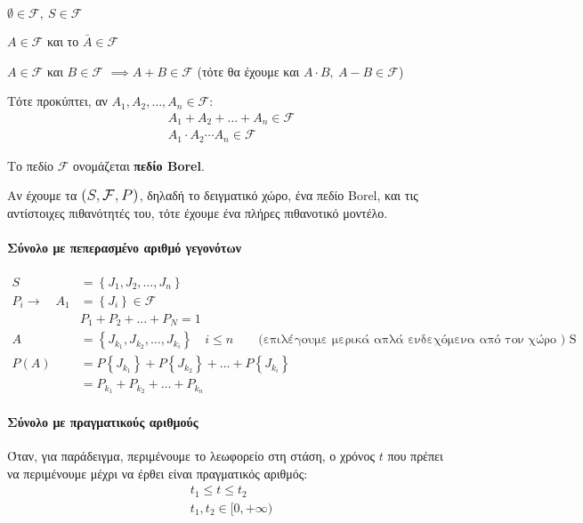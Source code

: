 \documentclass[11pt,a4paper,notitlepage,fleqn,draft]{article}
\begin{document}
	\begin{enumroman}
		\item \( \emptyset \in \mathcal F,\
		S \in \mathcal{F}
		 \)
		\item \( A \in \mathcal F \) και το \( \bar A \in \mathcal F \)
		\item \( A \in \mathcal F \) και \( B \in \mathcal F \)
		\( \implies A + B \in \mathcal F \) \quad
		(τότε θα έχουμε και \( A\cdot B,\ A-B \in \mathcal F \))
	\end{enumroman}
	
	Τότε προκύπτει, αν \( A_1,A_2,\dots,A_n \in \mathcal F \):
	\begin{gather*}
		A_1+A_2+\dots +A_n \in \mathcal F \\
		A_1\cdot A_2 \cdots A_n \in \mathcal F
	\end{gather*}
	
	Το πεδίο \( \mathcal F \) ονομάζεται \textbf{πεδίο Borel}.
	
	Αν έχουμε τα \( \mathlarger{\mathlarger{(S,\mathcal F,P)}} \),
	δηλαδή το
	δειγματικό χώρο, ένα πεδίο Borel, και τις αντίστοιχες πιθανότητές
	του, τότε έχουμε ένα πλήρες πιθανοτικό μοντέλο.
	
	\paragraph{Σύνολο με πεπερασμένο αριθμό γεγονότων}
	\begin{align*}
		S &= \left\lbrace J_1,J_2,\dots,J_n \right\rbrace \\
		P_i \to \quad A_1 &= 
		\left\lbrace J_i \right\rbrace \in \mathcal F \\
		& P_1+P_2+\dots+P_N = 1 \\
		A &= \left\lbrace J_{k_1},J_{k_2},\dots,J_{k_i} \right\rbrace
		\quad i \leq n \qquad \text{(επιλέγουμε μερικά
			απλά ενδεχόμενα από τον χώρο ) S} \\
		P(A) &= P\left\lbrace J_{k_1} \right\rbrace +
		P\left\lbrace J_{k_2} \right\rbrace + \dots +
		P\left\lbrace J_{k_i} \right\rbrace \\ &=
		P_{k_1} + P_{k_2} + \dots + P_{k_n}
	\end{align*}
	
	\paragraph{Σύνολο με πραγματικούς αριθμούς}
	Όταν, για παράδειγμα, περιμένουμε το λεωφορείο στη στάση, ο χρόνος
	\( t \) που πρέπει να περιμένουμε μέχρι να έρθει είναι πραγματικός
	αριθμός:
	\begin{gather*}
		t_1 \leq t \leq t_2 \\ t_1,t_2 \in [0,+\infty)
	\end{gather*}
	
\end{document}
